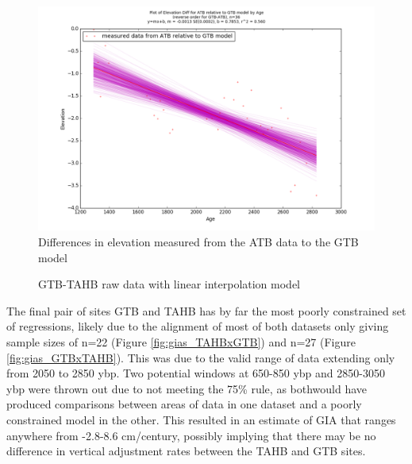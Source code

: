 \begin{figure}[h]
	\includegraphics[width=0.9\linewidth]{data/bothNonZero/withinSeventyFivePercent/gias/theGIA_ATB_relative_to_GTB.png}
	\caption{Differences in elevation measured from the ATB data to the GTB model}
	\label{fig:gias_ATBxGTB}
\end{figure}
\newpage










\begin{figure}[h]
	\caption{GTB-TAHB raw data with linear interpolation model}
	\label{fig:data_GTBxTAHB}
\end{figure}
The final pair of sites GTB and TAHB has by far the most poorly constrained set
of regressions, likely due to the alignment of most of both datasets only giving
sample sizes of n=22 (Figure \ref{fig:gias_TAHBxGTB}) and n=27 (Figure \ref{fig:gias_GTBxTAHB}).
This was due to the valid range of data extending only from 2050 to 2850 ybp. Two
potential windows at 650-850 ybp and 2850-3050 ybp were thrown out due to not
meeting the 75\% rule, as bothwould have produced comparisons between areas of
data in one dataset and a poorly constrained model in the other.
This resulted in an estimate of GIA that ranges anywhere from -2.8-8.6 cm/century,
possibly implying that there may be no difference in vertical adjustment rates
between the TAHB and GTB sites. 
\newpage

